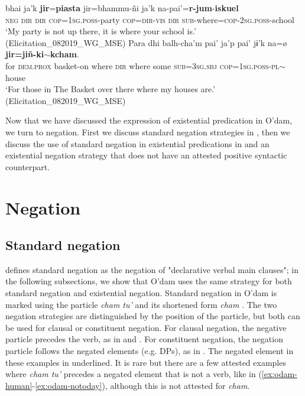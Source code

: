 \documentclass[output=paper,draft,draftmode,colorlinks,citecolor=brown]{langscibook}
\begin{document}
\ea
\label{ex:odam-mypartysch}
 bhai ja'k \textbf{jir}=\textbf{piasta} jir=bhammu-ñi ja'k na-pai’=\textbf{r-}\textbf{jum}-\textbf{iskuel}\\
\textsc{neg} \textsc{dir} \textsc{dir} \textsc{cop=1sg.poss-}party \textsc{cop=dir-vis} \textsc{dir} \textsc{sub}-where=\textsc{cop-2sg.poss}-school\\
\glt ‘My party is not up there, it is where your school is.’ (Elicitation\_082019\_WG\_MSE)
\z 
\ea
\label{ex:odam-mybask}
\gll Para 	dhi 	balh-cha'm     		pai'  	ja'p 	pai'    	jɨ'k 	{na=\o}	{\textbf{jir=}\textbf{jiñ-}\textbf{ki}\textbf{$\sim$kcham}}.\\
	for  	\textsc{dem.prox} 	basket-on 	where 	\textsc{dir} 	where  some 	\textsc{sub=3sg.sbj} 	\textsc{cop=1sg.poss-pl}$\sim$house\\
\glt ‘For those in The Basket over there where my houses are.’ (Elicitation\_082019\_WG\_MSE)
\z 

Now that we have discussed the expression of existential predication in
O'dam, we turn to negation. First we discuss standard negation strategies
in , then we discuss the use of standard negation
in existential predications in  and an existential negation strategy that does not have an attested positive syntactic counterpart.
\section{Negation}
\label{sec:odam-negation}
\subsection{Standard negation}
\label{sec:odam-staneg}
\citet[1]{Miestamo2005} defines standard negation as the negation of "declarative verbal main clauses"; in the following subsections, we show that O’dam uses the same strategy for both standard negation and existential negation. Standard negation in O’dam is marked using the particle \emph{cham tu’} and its shortened form \emph{cham} \citep[109]{garcia2014}. The two negation strategies are distinguished by the position of the particle, but both can be used for clausal or constituent negation. For clausal negation, the negative particle precedes the verb, as in  and . For constituent negation, the negation particle follows the negated elements (e.g. DPs), as in . The negated element in these examples in underlined. It is rare but there are a few attested examples where \emph{cham tu’} precedes a negated element that is not a verb, like in (\ref{ex:odam-human}-\ref{ex:odam-notoday}), although this is not attested for \emph{cham}.
\end{document}
